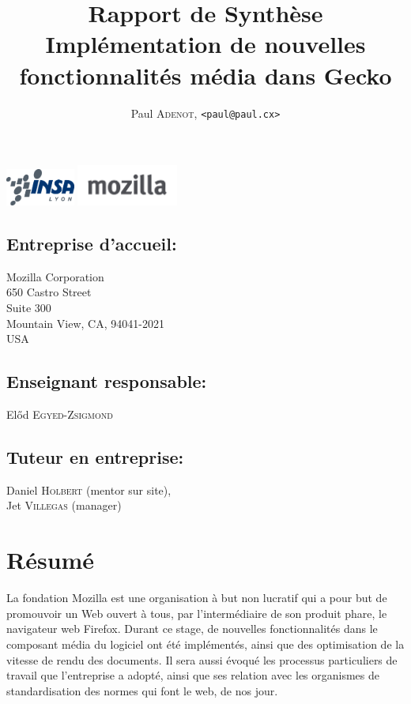 \documentclass[a4paper,10pt]{article}
\title{\textsf{\textbf{Rapport de Synthèse\\Implémentation de nouvelles
fonctionnalités média dans Gecko}}}
\author{Paul \textsc{Adenot}, \texttt{<paul@paul.cx>}}
\date{}
\begin{document}
\maketitle

\begin{center}
\includegraphics[width=0.17\textwidth]{img/insa-couleur.png}
\includegraphics[width=0.25\textwidth]{img/mozilla_wordmark.png}
\end{center}
\begin{minipage}{0.5\linewidth}
\subsection*{Entreprise d'accueil:}
\noindent
Mozilla Corporation\\
650 Castro Street\\
Suite 300\\
Mountain View, CA, 94041-2021\\
USA\\
\end{minipage}\begin{minipage}{0.5\linewidth}
\subsection*{Enseignant responsable:}
\noindent
Előd \textsc{Egyed-Zsigmond}
\subsection*{Tuteur en entreprise:}
\noindent
Daniel \textsc{Holbert} (mentor sur site),\\ Jet \textsc{Villegas} (manager)
\end{minipage}

\section*{Résumé}
La fondation Mozilla est une organisation à but non lucratif qui a pour but de
promouvoir un Web ouvert à tous, par l'intermédiaire de son produit phare,
le navigateur web Firefox. Durant ce stage, de nouvelles fonctionnalités dans
le composant média du logiciel ont été implémentés, ainsi que des optimisation
de la vitesse de rendu des documents. Il sera aussi évoqué les processus
particuliers de travail que l'entreprise a adopté, ainsi que ses relation avec
les organismes de standardisation des normes qui font le web, de nos jour.
\end{document}
